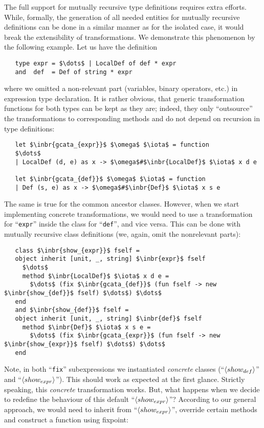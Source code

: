 The full support for mutually recursive type definitions requires extra efforts. While, formally, the generation of all needed entities for
mutually recursive definitions can be done in a similar manner as for the isolated case, it would break the extensibility of
transformations. We demonstrate this phenomenon by the following example. Let us have the definition

\begin{lstlisting}
   type expr = $\dots$ | LocalDef of def * expr
   and  def  = Def of string * expr
\end{lstlisting}

where we omitted a non-relevant part (variables, binary operators, etc.) in expression type declaration. It is rather obvious, that generic
transformation functions for both types can be kept as they are; indeed, they only ``outsource'' the transformations to corresponding
methods and do not depend on recursion in type definitions:

\begin{lstlisting}
   let $\inbr{gcata_{expr}}$ $\omega$ $\iota$ = function
   $\dots$
   | LocalDef (d, e) as x -> $\omega$#$\inbr{LocalDef}$ $\iota$ x d e

   let $\inbr{gcata_{def}}$ $\omega$ $\iota$ = function
   | Def (s, e) as x -> $\omega$#$\inbr{Def}$ $\iota$ x s e
\end{lstlisting}

The same is true for the common ancestor classes. However, when we start implementing concrete transformations, we would need to use a transformation
for ``\lstinline{expr}'' inside the class for ``\lstinline{def}'', and vice versa. This can be done with mutually recursive class definitions (we, again,
omit the nonrelevant parts):

\begin{lstlisting}
   class $\inbr{show_{expr}}$ fself =
   object inherit [unit, _, string] $\inbr{expr}$ fself
     $\dots$
     method $\inbr{LocalDef}$ $\iota$ x d e =
       $\dots$ (fix $\inbr{gcata_{def}}$ (fun fself -> new $\inbr{show_{def}}$ fself) $\dots$) $\dots$
   end
   and $\inbr{show_{def}}$ fself =
   object inherit [unit, _, string] $\inbr{def}$ fself
     method $\inbr{Def}$ $\iota$ x s e =
       $\dots$ (fix $\inbr{gcata_{expr}}$ (fun fself -> new $\inbr{show_{expr}}$ fself) $\dots$) $\dots$
   end
\end{lstlisting}

Note, in both ``\lstinline{fix}'' subexpressions we instantiated \emph{concrete} classes (``$\left<show_{def}\right>$'' and ``$\left<show_{expr}\right>$''). This should
work as expected at the first glance. Strictly speaking, this \emph{concrete} transformation works. But, what happens when we decide to redefine the behaviour of
this default ``$\left<show_{expr}\right>$''? According to our general approach, we would need to inherit from ``$\left<show_{expr}\right>$'', override certain methods and
construct a function using fixpoint:

